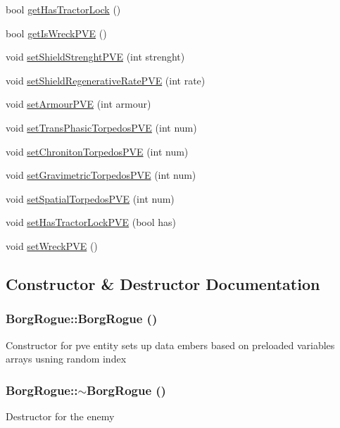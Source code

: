 \begin{DoxyCompactItemize}
\item 
bool \hyperlink{classBorgRogue_aece2200d14e0f1e3056ea52290a39f27}{getHasTractorLock} ()
\item 
bool \hyperlink{classBorgRogue_ac51cbf466e2db63dc9dd895cea4e1977}{getIsWreckPVE} ()
\item 
void \hyperlink{classBorgRogue_a99ce619718648684b12ffdbaa7fd983f}{setShieldStrenghtPVE} (int strenght)
\item 
void \hyperlink{classBorgRogue_afaa9f67e6e5536b0aa63ce8120c0247f}{setShieldRegenerativeRatePVE} (int rate)
\item 
void \hyperlink{classBorgRogue_af34a5a35c56e8a4758fa69e6937405d1}{setArmourPVE} (int armour)
\item 
void \hyperlink{classBorgRogue_aa758dd218dae6a330f53ec54e904831b}{setTransPhasicTorpedosPVE} (int num)
\item 
void \hyperlink{classBorgRogue_a1cf5168c6189366bd40bae7ec414b17f}{setChronitonTorpedosPVE} (int num)
\item 
void \hyperlink{classBorgRogue_a73ff2f1ab55d607fa9a39cfda5c22a8d}{setGravimetricTorpedosPVE} (int num)
\item 
void \hyperlink{classBorgRogue_ad983f34e403f754d256527f784465ba5}{setSpatialTorpedosPVE} (int num)
\item 
void \hyperlink{classBorgRogue_a81779a2a3027c82452c17fd0503f7d2c}{setHasTractorLockPVE} (bool has)
\item 
void \hyperlink{classBorgRogue_a534229bde2f85076dc13d0b5a7b7afb1}{setWreckPVE} ()
\end{DoxyCompactItemize}


\subsection{Constructor \& Destructor Documentation}
\hypertarget{classBorgRogue_ac7a4f4b617206d1b2ef3489a533f69e9}{
\subsubsection[{BorgRogue}]{\setlength{\rightskip}{0pt plus 5cm}BorgRogue::BorgRogue ()}}
\label{db/d4f/classBorgRogue_ac7a4f4b617206d1b2ef3489a533f69e9}
Constructor for pve entity sets up data embers based on preloaded variables arrays usning random index \hypertarget{classBorgRogue_a1afdc1a65a85e59f0e598a4877f173b7}{
\subsubsection[{$\sim$BorgRogue}]{\setlength{\rightskip}{0pt plus 5cm}BorgRogue::$\sim$BorgRogue ()}}
\label{db/d4f/classBorgRogue_a1afdc1a65a85e59f0e598a4877f173b7}
Destructor for the enemy 

